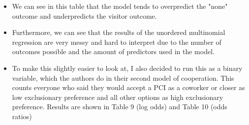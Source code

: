 \documentclass[12pt,letterpaper]{article}
\begin{document}
\begin{itemize}
	\item We can see in this table that the model tends to overpredict the "none" outcome and underpredicts the visitor outcome.
	\item Furthermore, we can see that the results of the unordered multinomial regression are very messy and hard to interpret due to the number of outcomes possible and the amount of predictors used in the model. 
	\item To make this slightly easier to look at, I also decided to run this as a binary variable, which the authors do in their second model of cooperation. This counts everyone who said they would accept a PCI as a coworker or closer as low exclusionary preference and all other options as high exclusionary preference. Results are shown in Table 9 (log odds) and Table 10 (odds ratios)
		
\end{itemize}
\end{document}
